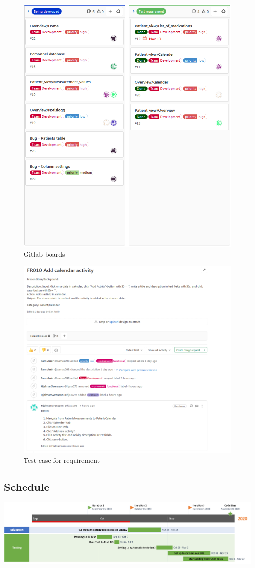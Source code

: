 \begin{figure}

    \centering
    \includegraphics[scale=0.5]{Pictures/gitlab2.PNG}
    \caption{Gitlab boards}
\end{figure}
\begin{figure}

    \centering
    \includegraphics[scale=0.75]{Pictures/TestCase1.PNG}
    \caption{Test case for requirement}
\end{figure}
\subsection{Schedule}
\vfill
\includegraphics[width=\linewidth]{Pictures/TestSchedule.PNG}

    \vfill
\clearpage
